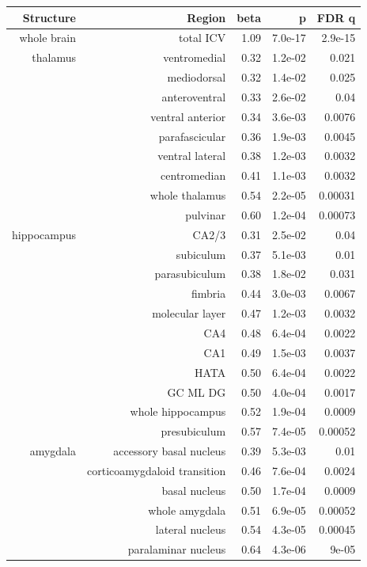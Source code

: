 \documentclass[
]{article}
\begin{document}
\begin{longtable}{rrrrr}
\toprule
Structure & Region & beta & p & FDR q \\ 
\midrule\addlinespace[2.5pt]
whole brain & total ICV & 1.09 & 7.0e-17 & 2.9e-15 \\ 
thalamus & ventromedial & 0.32 & 1.2e-02 & 0.021 \\ 
 & mediodorsal & 0.32 & 1.4e-02 & 0.025 \\ 
 & anteroventral & 0.33 & 2.6e-02 & 0.04 \\ 
 & ventral anterior & 0.34 & 3.6e-03 & 0.0076 \\ 
 & parafascicular & 0.36 & 1.9e-03 & 0.0045 \\ 
 & ventral lateral & 0.38 & 1.2e-03 & 0.0032 \\ 
 & centromedian & 0.41 & 1.1e-03 & 0.0032 \\ 
 &  whole thalamus & 0.54 & 2.2e-05 & 0.00031 \\ 
 & pulvinar & 0.60 & 1.2e-04 & 0.00073 \\ 
hippocampus & CA2/3 & 0.31 & 2.5e-02 & 0.04 \\ 
 & subiculum & 0.37 & 5.1e-03 & 0.01 \\ 
 & parasubiculum & 0.38 & 1.8e-02 & 0.031 \\ 
 & fimbria & 0.44 & 3.0e-03 & 0.0067 \\ 
 & molecular layer & 0.47 & 1.2e-03 & 0.0032 \\ 
 & CA4 & 0.48 & 6.4e-04 & 0.0022 \\ 
 & CA1 & 0.49 & 1.5e-03 & 0.0037 \\ 
 & HATA & 0.50 & 6.4e-04 & 0.0022 \\ 
 & GC ML DG & 0.50 & 4.0e-04 & 0.0017 \\ 
 & whole hippocampus & 0.52 & 1.9e-04 & 0.0009 \\ 
 & presubiculum & 0.57 & 7.4e-05 & 0.00052 \\ 
amygdala & accessory basal nucleus & 0.39 & 5.3e-03 & 0.01 \\ 
 & corticoamygdaloid transition & 0.46 & 7.6e-04 & 0.0024 \\ 
 & basal nucleus & 0.50 & 1.7e-04 & 0.0009 \\ 
 & whole amygdala & 0.51 & 6.9e-05 & 0.00052 \\ 
 & lateral nucleus & 0.54 & 4.3e-05 & 0.00045 \\ 
 & paralaminar nucleus & 0.64 & 4.3e-06 & 9e-05 \\ 
\bottomrule
\end{longtable}
\end{document}
